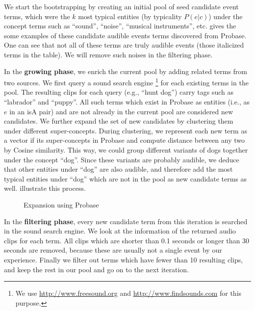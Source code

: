 We start the bootstrapping by creating an initial pool of
seed candidate event terms, which were the $k$ most typical
entities (by typicality $P(e | c)$)
under the concept terms such as ``sound'', ``noise'', ``musical instruments'',
etc.   gives the some examples of these candidate audible events 
terms discovered from Probase. One can see that not all of these terms
are truly audible events (those italicized terms in the table). 
We will remove such noises in the filtering phase.

In the {\bf growing phase}, we enrich the current pool by adding related terms
from two sources. We first query a sound search engine
\footnote{We use \url{http://www.freesound.org} and \url{http://www.findsounds.com} for this purpose.}
for each existing terms in the pool. The resulting clips for each query
(e.g., ``hunt dog'') carry tags such as ``labrador'' and ``puppy''. 
All such terms
which exist in Probase as entities (i.e., as $e$ in an isA pair) and
are not already in the current pool are considered new candidates.
We further expand the set of new candidates by clustering them 
under different super-concepts. During clustering, we represent each
new term as a vector if its super-concepts in Probase and compute distance
between any two by Cosine similarity. This way, we could group different 
variants of dogs together under the concept ``dog''. Since these variants
are probably audible, we deduce that other entities under ``dog'' are also
audible, and therefore add the most typical entities under ``dog'' which
are not in the pool as new candidate terms as well.  illustrate
this process.

\begin{figure}[th]
\centering
{}
\caption{Expansion using Probase}
\label{fig:expand}
\end{figure}


In the {\bf filtering phase}, every new candidate term from this iteration
is searched in the sound search engine. We look at the information of the
returned audio clips for each term. All clips which are shorter than 0.1 seconds
or longer than 30 seconds are removed, because these are usually not a single
event by our experience. Finally we filter out terms which have
fewer than 10 resulting clips, and keep the rest in our pool and go on to
the next iteration. 


